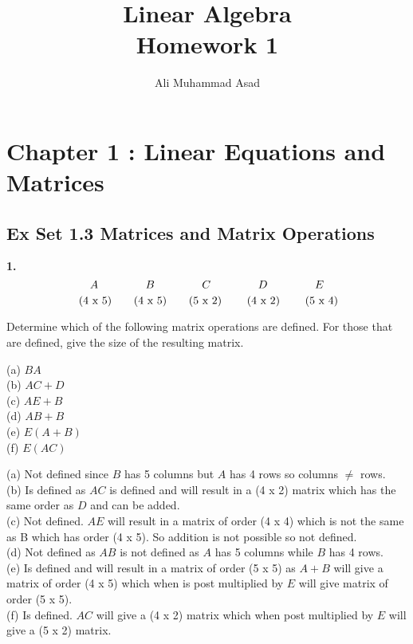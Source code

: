\documentclass[addpoints]{exam}
\title{Linear Algebra\\ Homework 1}
\author{Ali Muhammad Asad}
\begin{document}
\maketitle
\begin{sloppypar}
\section*{\textbf{Chapter 1 : Linear Equations and Matrices}}
\subsection*{\textbf{Ex Set 1.3 Matrices and Matrix Operations}}
\begin{questions}
    \question
    \textbf{1.} $$ A \text{\hspace{15mm}} B \text{\hspace{15mm}} C \text{\hspace{15mm}} D \text{\hspace{15mm}} E$$
    $$ \text{\hspace{1mm}} (4 \text{ x } 5) \text{\hspace{7mm}} (4 \text{ x } 5) \text{\hspace{7mm}} (5 \text{ x } 2) \text{\hspace{8mm}} (4 \text{ x } 2) \text{\hspace{8mm}} (5 \text{ x } 4) $$
    
    Determine which of the following matrix operations are defined. For those that are defined, give the size of the resulting matrix. 

    (a) $ BA $ \\ (b) $ AC + D $ \\ (c) $ AE + B $ \\ (d) $ AB + B $ \\ (e) $ E(A + B) $ \\ (f) $ E(AC) $
    \begin{solution}
        
        (a) Not defined since $B$ has 5 columns but $A$ has 4 rows so columns $\neq$ rows. \\ 
        (b) Is defined as $AC$ is defined and will result in a (4 x 2) matrix which has the same order as $D$ and can be added. \\ 
        (c) Not defined. $AE$ will result in a matrix of order (4 x 4) which is not the same as B which has order (4 x 5). So addition is not possible so not defined. \\ 
        (d) Not defined as $AB$ is not defined as $A$ has 5 columns while $B$ has 4 rows. \\ 
        (e) Is defined and will result in a matrix of order (5 x 5) as $A + B$ will give a matrix of order (4 x 5) which when is post multiplied by $E$ will give matrix of order (5 x 5). \\ 
        (f) Is defined. $AC$ will give a (4 x 2) matrix which when post multiplied by $E$ will give a (5 x 2) matrix. 
    \end{solution}
    

\end{questions}
\end{sloppypar}
\end{document}
